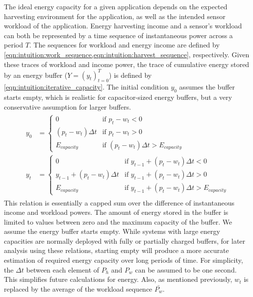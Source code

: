 The ideal energy capacity for a given application depends on the
expected harvesting environment for the application,
as well as the
intended sensor workload of the application.
Energy harvesting income and a sensor's workload can both be represented by a time sequence of instantaneous power across a period $T$.
The sequences for workload and energy income are defined by \cref{eqn:intuition:work_sequence,eqn:intuition:harvest_sequence}, respectively.
Given these traces of workload and income power, the trace of cumulative energy stored by an energy buffer ($Y = (y_t)^T_{t=0}$) is defined by \cref{eqn:intuition:iterative_capacity}. The initial condition $y_0$ assumes the buffer starts empty, which is realistic for capacitor-sized energy buffers, but a very conservative assumption for larger buffers.
\begin{align}
\begin{split}
    y_0 &= \begin{cases}
        0                       & \text{if $p_t - w_t < 0$} \\
        (p_t - w_t) \Delta t    & \text{if $p_t - w_t > 0$} \\
        E_{capacity}            & \text{if $(p_t - w_t) \Delta t > E_{capacity}$}
    \end{cases} \\
    y_t &= \begin{cases}
        0                               & \text{if $y_{t-1} + (p_t - w_t) \Delta t < 0$} \\
        y_{t-1} + (p_t - w_t) \Delta t  & \text{if $y_{t-1} + (p_t - w_t) \Delta t > 0$} \\
        E_{capacity}                    & \text{if $y_{t-1} + (p_t - w_t) \Delta t > E_{capacity}$}
    \end{cases}
    \end{split} \label{eqn:intuition:iterative_capacity}
\end{align}
This relation is essentially a capped sum over the difference of instantaneous income and workload powers. The amount of energy stored in the buffer is limited to values between zero and the maximum capacity of the buffer.
We assume the energy buffer starts empty.
While systems with large energy capacities are normally deployed with fully or partially charged buffers,
for later analysis using these relations, starting empty will produce a more accurate estimation of required energy capacity over long periods of time.
For simplicity, the $\Delta t$ between each element of $P_h$ and $P_w$ can be assumed to be one second. This simplifies future calculations for energy. Also, as mentioned previously, $w_t$ is replaced by the average of the workload sequence $\bar{P_w}$.

